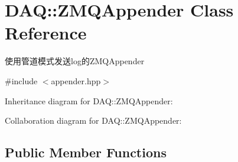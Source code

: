 \hypertarget{classDAQ_1_1ZMQAppender}{}\section{D\+AQ\+:\+:Z\+M\+Q\+Appender Class Reference}
\label{classDAQ_1_1ZMQAppender}


使用管道模式发送log的\+Z\+M\+Q\+Appender  




{\ttfamily \#include $<$appender.\+hpp$>$}



Inheritance diagram for D\+AQ\+:\+:Z\+M\+Q\+Appender\+:


Collaboration diagram for D\+AQ\+:\+:Z\+M\+Q\+Appender\+:
\subsection*{Public Member Functions}
